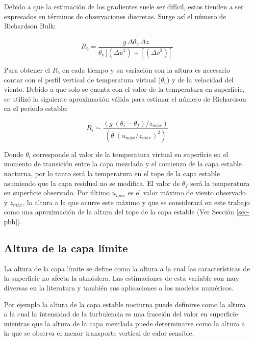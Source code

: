 \documentclass[12pt,spanish,oneside, a4paper]{book}
\begin{document}
Debido a que la estimación de los gradientes suele ser difícil, estos
tienden a ser expresados en términos de observaciones discretas. Surge
así el número de Richardson Bulk:

\begin{equation} \label{eq-ri2}
R_b = \frac{g \, \Delta \overline{\theta_v} \, \Delta z}{\overline{\theta_v} \, [(\Delta \overline{u}^2) + [(\Delta \overline{v}^2)]}
\end{equation}

Para obtener el \(R_b\) en cada tiempo y su variación con la altura es
necesario contar con el perfil vertical de temperatura virtual
(\(\theta_v\)) y de la velocidad del viento. Debido a que solo se cuenta
con el valor de la temperatura en superficie, se utilizó la siguiente
aproximación válida para estimar el número de Richardson en el periodo
estable:

\begin{equation} \label{eq-ri3}
R_i \sim \frac{(g  \: (\theta_i - \theta_f)/z_{máx})}{(\overline{\theta} \: (u_{máx}/z_{máx})^2)}
\end{equation}

Donde \(\theta_i\) corresponde al valor de la temperatura virtual en
superficie en el momento de transición entre la capa mezclada y el
comienzo de la capa estable nocturna, por lo tanto será la temperatura
en el tope de la capa estable asumiendo que la capa residual no se
modifica. El valor de \(\theta_f\) será la temperatura en superficie
observado. Por último \(u_{máx}\) es el valor máximo de viento observado
y \(z_{máx}\), la altura a la que ocurre este máximo y que se
considerará en este trabajo como una aproximación de la altura del tope
de la capa estable (Ver Sección \ref{sec-pbh}).

\subsection{\texorpdfstring{Altura de la capa límite
\label{sec-pbh}}{Altura de la capa límite }}\label{altura-de-la-capa-limite}

La altura de la capa límite se define como la altura a la cual las
características de la superficie no afecta la atmósfera. Las
estimaciones de esta variable son muy diversas en la literatura y
también sus aplicaciones a los modelos numéricos.

Por ejemplo la altura de la capa estable nocturna puede definirse como
la altura a la cual la intensidad de la turbulencia es una fracción del
valor en superficie mientras que la altura de la capa mezclada puede
determinarse como la altura a la que se observa el menor transporte
vertical de calor sensible.
\end{document}
